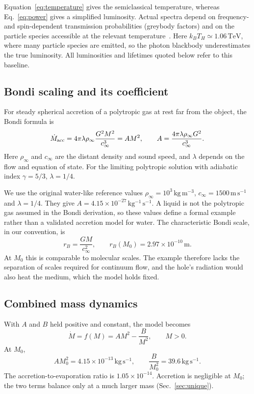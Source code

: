 \documentclass[11pt,a4paper]{article}
\begin{document}
Equation~\eqref{eq:temperature} gives the semiclassical temperature, whereas Eq.~\eqref{eq:power} gives a simplified luminosity. Actual spectra depend on frequency- and spin-dependent transmission probabilities (greybody factors) and on the particle species accessible at the relevant temperature~\cite{page,macgibbon}. Here $k_BT_H\simeq1.06\,\mathrm{TeV}$, where many particle species are emitted, so the photon blackbody underestimates the true luminosity. All luminosities and lifetimes quoted below refer to this baseline.

\subsection{Bondi scaling and its coefficient}\label{sec:bondi}
For steady spherical accretion of a polytropic gas at rest far from the object, the Bondi formula is~\cite{bondi}
\begin{equation*}
 \dot M_{\rm acc}=4\pi\lambda\rho_\infty\frac{G^2M^2}{c_\infty^3}=AM^2,
 \qquad A=\frac{4\pi\lambda\rho_\infty G^2}{c_\infty^3}.
\end{equation*}
Here $\rho_\infty$ and $c_\infty$ are the distant density and sound speed, and $\lambda$ depends on the flow and equation of state. For the limiting polytropic solution with adiabatic index $\gamma=5/3$, $\lambda=1/4$.

We use the original water-like reference values $\rho_\infty=10^3\,\mathrm{kg\,m^{-3}}$, $c_\infty=1500\,\mathrm{m\,s^{-1}}$ and $\lambda=1/4$. They give $A=4.15\times10^{-27}\,\mathrm{kg^{-1}\,s^{-1}}$. A liquid is not the polytropic gas assumed in the Bondi derivation, so these values define a formal example rather than a validated accretion model for water. The characteristic Bondi scale, in our convention, is
\begin{equation*}
 r_B=\frac{GM}{c_\infty^2},\qquad r_B(M_0)=2.97\times10^{-10}\,\mathrm m.
\end{equation*}
At $M_0$ this is comparable to molecular scales. The example therefore lacks the separation of scales required for continuum flow, and the hole's radiation would also heat the medium, which the model holds fixed.

\subsection{Combined mass dynamics}
With $A$ and $B$ held positive and constant, the model becomes
\begin{equation}
 \dot M=f(M)=AM^2-\frac{B}{M^2},\qquad M>0.
 \label{eq:mass}
\end{equation}
At $M_0$,
\begin{equation*}
 AM_0^2=4.15\times10^{-13}\,\mathrm{kg\,s^{-1}},\qquad
 \frac{B}{M_0^2}=39.6\,\mathrm{kg\,s^{-1}}.
\end{equation*}
The accretion-to-evaporation ratio is $1.05\times10^{-14}$. Accretion is negligible at $M_0$; the two terms balance only at a much larger mass (Sec.~\ref{sec:unique}).
\end{document}
